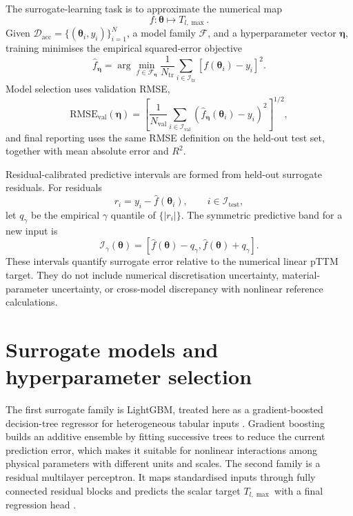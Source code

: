 The surrogate-learning task is to approximate the numerical map
\begin{equation}
    f:\boldsymbol{\theta}\mapsto T_{l,\max}.
\end{equation}
Given $\mathcal{D}_{\mathrm{acc}}=\{(\boldsymbol{\theta}_i,y_i)\}_{i=1}^{N}$, a model family $\mathcal{F}$, and a hyperparameter vector $\boldsymbol{\eta}$, training minimises the empirical squared-error objective
\begin{equation}
    \hat{f}_{\boldsymbol{\eta}}
    =
    \arg\min_{f\in\mathcal{F}_{\boldsymbol{\eta}}}
    \frac{1}{N_{\mathrm{tr}}}
    \sum_{i\in\mathcal{I}_{\mathrm{tr}}}
    \left[
        f(\boldsymbol{\theta}_i)-y_i
        \right]^2.
\end{equation}
Model selection uses validation RMSE,
\begin{equation}
    \mathrm{RMSE}_{\mathrm{val}}(\boldsymbol{\eta})
    =
    \left[
    \frac{1}{N_{\mathrm{val}}}
    \sum_{i\in\mathcal{I}_{\mathrm{val}}}
    \left(
    \hat{f}_{\boldsymbol{\eta}}(\boldsymbol{\theta}_i)-y_i
    \right)^2
    \right]^{1/2},
\end{equation}
and final reporting uses the same RMSE definition on the held-out test set, together with mean absolute error and $R^2$.

Residual-calibrated predictive intervals are formed from held-out surrogate residuals. For residuals
\begin{equation}
    r_i
    =
    y_i-\hat{f}(\boldsymbol{\theta}_i),
    \qquad i\in\mathcal{I}_{\mathrm{test}},
\end{equation}
let $q_{\gamma}$ be the empirical $\gamma$ quantile of $\{|r_i|\}$. The symmetric predictive band for a new input is
\begin{equation}
    \mathcal{I}_{\gamma}(\boldsymbol{\theta})
    =
    \left[
    \hat{f}(\boldsymbol{\theta})-q_{\gamma},
    \hat{f}(\boldsymbol{\theta})+q_{\gamma}
    \right].
\end{equation}
These intervals quantify surrogate error relative to the numerical linear pTTM target. They do not include numerical discretisation uncertainty, material-parameter uncertainty, or cross-model discrepancy with nonlinear reference calculations.

\section{Surrogate models and hyperparameter selection}

The first surrogate family is LightGBM, treated here as a gradient-boosted decision-tree regressor for heterogeneous tabular inputs \cite{Friedman_2001,ke2017lightgbm}. Gradient boosting builds an additive ensemble by fitting successive trees to reduce the current prediction error, which makes it suitable for nonlinear interactions among physical parameters with different units and scales. The second family is a residual multilayer perceptron. It maps standardised inputs through fully connected residual blocks and predicts the scalar target $T_{l,\max}$ with a final regression head \cite{goodfellow2016deep}.


